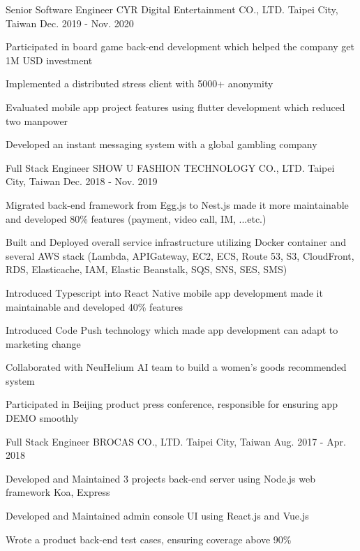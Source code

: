 \begin{cventries}
  \cventry
    {Senior Software Engineer} %
    {CYR Digital Entertainment CO., LTD.} %
    {Taipei City, Taiwan} %
    {Dec. 2019 - Nov. 2020} %
    {
      \begin{cvitems} %
        \item {Participated in board game back-end development which helped the company get 1M USD investment}
        \item {Implemented a distributed stress client with 5000+ anonymity}
        \item {Evaluated mobile app project features using flutter development which reduced two manpower}
        \item {Developed an instant messaging system with a global gambling company}
      \end{cvitems}
    }

  \cventry
    {Full Stack Engineer} %
    {SHOW U FASHION TECHNOLOGY CO., LTD.} %
    {Taipei City, Taiwan} %
    {Dec. 2018 - Nov. 2019} %
    {
      \begin{cvitems} %
        \item {Migrated back-end framework from Egg.js to Nest.js made it more maintainable and developed 80\% features (payment, video call, IM, ...etc.)}
        \item {Built and Deployed overall service infrastructure utilizing Docker container and several AWS stack (Lambda, APIGateway, EC2, ECS, Route 53, S3, CloudFront, RDS, Elasticache, IAM, Elastic Beanstalk, SQS, SNS, SES, SMS)}
        \item {Introduced Typescript into React Native mobile app development made it maintainable and developed 40\% features }
        \item {Introduced Code Push technology which made app development can adapt to marketing change}
        \item {Collaborated with NeuHelium AI team to build a women's goods recommended system}
        \item {Participated in Beijing product press conference, responsible for ensuring app DEMO smoothly}
      \end{cvitems}
    }

  \cventry
    {Full Stack Engineer} %
    {BROCAS CO., LTD.} %
    {Taipei City, Taiwan} %
    {Aug. 2017 - Apr. 2018} %
    {
      \begin{cvitems} %
        \item {Developed and Maintained 3 projects back-end server using Node.js web framework Koa, Express}
        \item {Developed and Maintained admin console UI using React.js and Vue.js}
        \item {Wrote a product back-end test cases, ensuring coverage above 90\%}
      \end{cvitems}
    }


\end{cventries}
